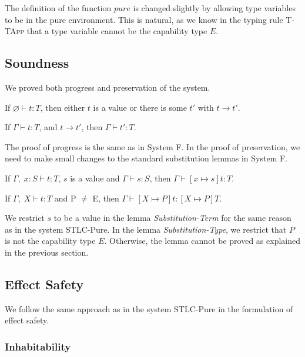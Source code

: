 The definition of the function $pure$ is changed slightly by allowing
type variables to be in the pure environment. This is natural, as we
know in the typing rule \textsc{T-TApp} that a type variable cannot be
the capability type $E$.

\subsection{Soundness}

We proved both progress and preservation of the system.

\begin{theorem}[Progress]
If $\varnothing \vdash t : T$, then either $t$ is a value or there is some
$t'$ with $t \longrightarrow t'$.
\end{theorem}

\begin{theorem}[Preservation]
If $\Gamma \vdash t : T$, and $t \longrightarrow t'$, then $\Gamma
\vdash t' : T$.
\end{theorem}

The proof of progress is the same as in System F. In the proof of
preservation, we need to make small changes to the standard
substitution lemmas in System F.

\begin{lemma}
  If $\Gamma,\; x:S \vdash t : T$, $s$ is a value and
  $\Gamma \vdash s : S$, then $\Gamma \vdash [x \mapsto s]t : T$.
\end{lemma}

\begin{lemma}
  If $\Gamma,\; X \vdash t : T$ and P $\neq$ E,
  then $\Gamma \vdash [X \mapsto P]t : [X \mapsto P]T$.
\end{lemma}

We restrict $s$ to be a value in the lemma \emph{Substitution-Term}
for the same reason as in the system STLC-Pure. In the lemma
\emph{Substitution-Type}, we restrict that $P$ is not the capability
type $E$. Otherwise, the lemma cannot be proved as explained in the
previous section.

\subsection{Effect Safety}

We follow the same approach as in the system STLC-Pure in the
formulation of effect safety.

\subsubsection{Inhabitability}

